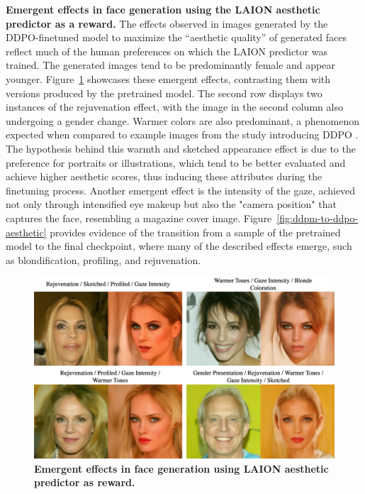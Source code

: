 \noindent \textbf{Emergent effects in face generation using the LAION aesthetic predictor as a reward.} The effects observed in images generated by the DDPO-finetuned model to maximize the ``aesthetic quality'' of generated faces reflect much of the human preferences on which the LAION predictor was trained. The generated images tend to be predominantly female and appear younger. Figure~\ref{fig:aesthetic-effects} showcases these emergent effects, contrasting them with versions produced by the pretrained model. The second row displays two instances of the rejuvenation effect, with the image in the second column also undergoing a gender change. Warmer colors are also predominant, a phenomenon expected when compared to example images from the study introducing DDPO \cite{black2023training}. The hypothesis behind this warmth and sketched appearance effect is due to the preference for portraits or illustrations, which tend to be better evaluated and achieve higher aesthetic scores, thus inducing these attributes during the finetuning process. Another emergent effect is the intensity of the gaze, achieved not only through intensified eye makeup but also the "camera position" that captures the face, resembling a magazine cover image. Figure~\ref{fig:ddpm-to-ddpo-aesthetic} provides evidence of the transition from a sample of the pretrained model to the final checkpoint, where many of the described effects emerge, such as blondification, profiling, and rejuvenation.

\begin{figure}[ht]
  \centering
  \includegraphics[scale=0.85]{img/results/aesthetic-effects.png}
  \vspace{-0pt}  %
    \captionsetup{width=\textwidth} %
    \caption{\textbf{Emergent effects in face generation using LAION aesthetic predictor as reward.}}
    \label{fig:aesthetic-effects}
\end{figure}

